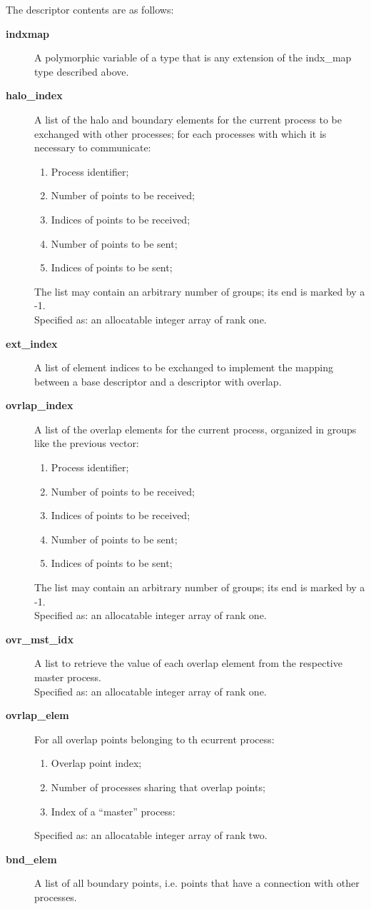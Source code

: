 The descriptor contents are as follows:
\begin{description}
\item[{\bf indxmap}] A polymorphic variable of a type that is any
  extension of the indx\_map type described above. \\
\item[{\bf halo\_index}] A list of the halo and boundary elements for
the current process to be exchanged with other processes; for each
processes with which it is necessary to communicate:
\begin{enumerate}
\item Process identifier;
\item Number of points to be received;
\item Indices of points to be received;
\item Number of points to be sent;
\item Indices of points to be sent;
\end{enumerate}
The list may contain an arbitrary number of groups; its end is marked
by a -1.\\
Specified as: an allocatable integer array of rank one.
\item[{\bf ext\_index}] A list of element indices to be exchanged to
  implement the mapping between a base descriptor and a descriptor
  with overlap. 
\item [{\bf ovrlap\_index}] A list of the overlap elements for the
current process, organized in groups like the previous vector:
\begin{enumerate}
\item Process identifier;
\item Number of points to be received;
\item Indices of points to be received;
\item Number of points to be sent;
\item Indices of points to be sent;
\end{enumerate}
The list may contain an arbitrary number of groups; its end is marked
by a -1.\\
Specified as: an allocatable integer array  of rank one.
\item [{\bf ovr\_mst\_idx}] A list to retrieve the value of each
  overlap element from the respective master process.\\
Specified as: an allocatable integer array of rank one.
\item [{\bf ovrlap\_elem}] For all overlap points belonging to th
ecurrent process:
\begin{enumerate}
\item Overlap point index;
\item Number of processes sharing that overlap points;
\item Index of a ``master'' process: 
\end{enumerate}
Specified as: an allocatable integer array of rank two.
\item [{\bf bnd\_elem}] A list of all boundary points, i.e. points
  that have a connection with other processes.
\end{description}
